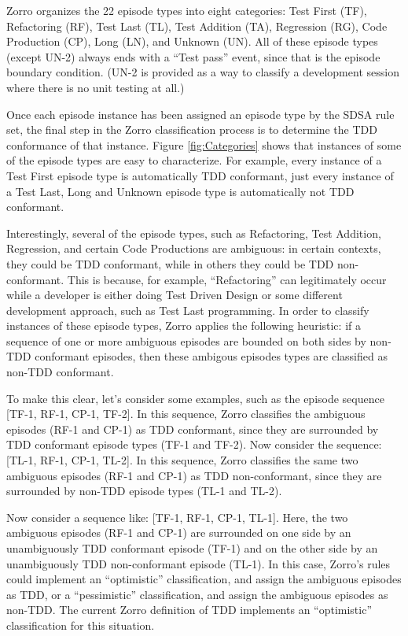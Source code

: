 \documentclass[smallextended]{svjour3}     %
\begin{document}
Zorro organizes the 22 episode types into eight categories: Test First
(TF), Refactoring (RF), Test Last (TL), Test Addition (TA), Regression
(RG), Code Production (CP), Long (LN), and Unknown (UN).  All of these
episode types (except UN-2) always ends with a ``Test pass'' event, since that
is the episode boundary condition.  (UN-2 is provided as a way to classify
a development session where there is no unit testing at all.)

Once each episode instance has been assigned an episode type by the SDSA
rule set, the final step in the Zorro classification process is to
determine the TDD conformance of that instance.  Figure
\ref{fig:Categories} shows that instances of some of the episode types are
easy to characterize. For example, every instance of a Test First episode
type is automatically TDD conformant, just every instance of a Test Last,
Long and Unknown episode type is automatically not TDD conformant.

Interestingly, several of the episode types, such as Refactoring, Test
Addition, Regression, and certain Code Productions are ambiguous: in
certain contexts, they could be TDD conformant, while in others they could
be TDD non-conformant.  This is because, for example, ``Refactoring'' can
legitimately occur while a developer is either doing Test Driven Design or
some different development approach, such as Test Last programming.  In
order to classify instances of these episode types, Zorro applies the
following heuristic: if a sequence of one or more ambiguous episodes are
bounded on both sides by non-TDD conformant episodes, then these ambigous
episodes types are classified as non-TDD conformant.

To make this clear, let's consider some examples, such as the episode
sequence [TF-1, RF-1, CP-1, TF-2].  In this sequence, Zorro classifies the
ambiguous episodes (RF-1 and CP-1) as TDD conformant, since they are
surrounded by TDD conformant episode types (TF-1 and TF-2).  Now consider
the sequence: [TL-1, RF-1, CP-1, TL-2].  In this sequence, Zorro classifies
the same two ambiguous episodes (RF-1 and CP-1) as TDD non-conformant,
since they are surrounded by non-TDD episode types (TL-1 and TL-2).

Now consider a sequence like: [TF-1, RF-1, CP-1, TL-1].  Here, the two
ambiguous episodes (RF-1 and CP-1) are surrounded on one side by an
unambiguously TDD conformant episode (TF-1) and on the other side by an
unambiguously TDD non-conformant episode (TL-1).  In this case, Zorro's
rules could implement an ``optimistic'' classification, and assign the
ambiguous episodes as TDD, or a ``pessimistic'' classification, and assign
the ambiguous episodes as non-TDD.  The current Zorro definition of TDD
implements an ``optimistic'' classification for this situation.
\end{document}
